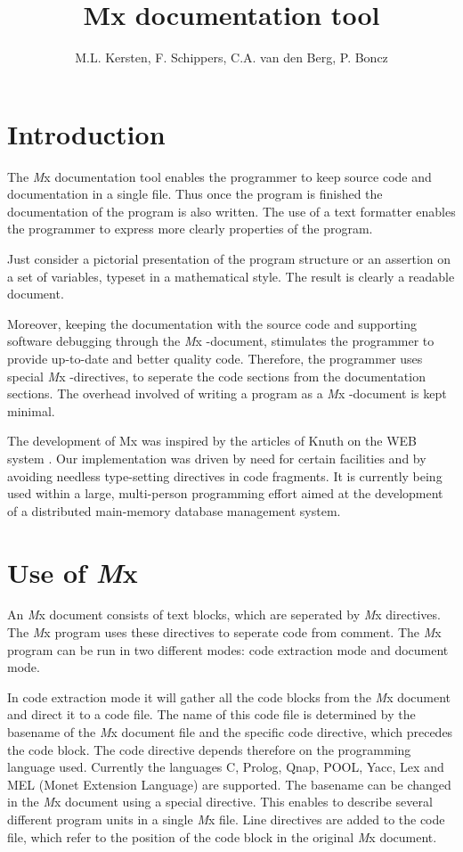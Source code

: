 
\newcommand{\Mx}{{\it M}x }
\title{Mx documentation tool}
\author{M.L. Kersten, F. Schippers, C.A. van den Berg, P. Boncz}
\maketitle

\section{Introduction}
The \Mx documentation tool enables the programmer to keep 
source code and documentation in a single file. Thus once the program 
is finished the documentation of the program is also written. 
The use of a text formatter enables the programmer to express more 
clearly properties of the program. 

Just consider a pictorial presentation of the program structure or an 
assertion on a set of variables, typeset in a mathematical style. 
The result is clearly a readable document. 

Moreover, keeping the documentation with the source code
and supporting software debugging through the \Mx-document,
stimulates the programmer to provide up-to-date and better quality code.
Therefore, the programmer uses special \Mx-directives, to seperate
the code sections from the documentation sections. 
The overhead involved of writing a program as a \Mx-document is 
kept minimal.

The development of Mx was inspired by the articles of Knuth on the
WEB system \cite{Literate} \cite{Programming}. 
Our implementation was driven by need for certain facilities
and by avoiding needless type-setting directives in code fragments.
It is currently being used within a large, multi-person programming
effort aimed at the development of a distributed main-memory database
management system.

\newpage
\section{Use of \Mx}
An \Mx document consists of text blocks, which are seperated by \Mx
directives. The \Mx program uses these directives to seperate code
from comment. The \Mx program can be run in two different modes:
code extraction mode and document mode. 

In code extraction mode it will gather all the code blocks from the
\Mx document and direct it to a code file. The name of this code file
is determined by the basename of the \Mx document file and the specific
code directive, which precedes the code block. The code directive
depends therefore on the programming language used. Currently the
languages  C, Prolog, Qnap, POOL, Yacc, Lex and MEL (Monet Extension Language)
are supported.
The basename can be changed in the \Mx document using a special
directive. This enables to describe several different program units in
a single \Mx file. Line directives are added to the code file, 
which refer to the position of the code block in the original \Mx document. 

